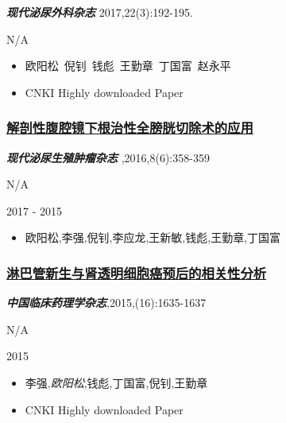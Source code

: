 \documentclass[]{article}
\providecommand{\tightlist}{%
  \setlength{\itemsep}{0pt}\setlength{\parskip}{0pt}}
\begin{document}
\emph{\textbf{现代泌尿外科杂志}} 2017,22(3):192-195.

N/A

\begin{itemize}
\tightlist
\item
  欧阳松~倪钊~钱彪~王勤章~丁国富~赵永平
\item
   CNKI Highly downloaded Paper
\end{itemize}

\hypertarget{ux89e3ux5256ux6027ux8179ux8154ux955cux4e0bux6839ux6cbbux6027ux5168ux8180ux80f1ux5207ux9664ux672fux7684ux5e94ux7528}{%
\subsubsection{\texorpdfstring{\href{https://doi.org/10.3870/j.issn.1674-4624.2016.06.010}{解剖性腹腔镜下根治性全膀胱切除术的应用}}{解剖性腹腔镜下根治性全膀胱切除术的应用}}\label{ux89e3ux5256ux6027ux8179ux8154ux955cux4e0bux6839ux6cbbux6027ux5168ux8180ux80f1ux5207ux9664ux672fux7684ux5e94ux7528}}

\emph{\textbf{现代泌尿生殖肿瘤杂志}} ,2016,8(6):358-359

N/A

2017 - 2015

\begin{itemize}
\tightlist
\item
  欧阳松,李强,倪钊,李应龙,王新敏,钱彪,王勤章,丁国富
\end{itemize}

\hypertarget{ux6dcbux5df4ux7ba1ux65b0ux751fux4e0eux80beux900fux660eux7ec6ux80deux764cux9884ux540eux7684ux76f8ux5173ux6027ux5206ux6790}{%
\subsubsection{\texorpdfstring{\href{http://kns.cnki.net/kcms/detail/detail.aspx?FileName=GLYZ201516025\&DbName=CJFQ2015}{淋巴管新生与肾透明细胞癌预后的相关性分析}}{淋巴管新生与肾透明细胞癌预后的相关性分析}}\label{ux6dcbux5df4ux7ba1ux65b0ux751fux4e0eux80beux900fux660eux7ec6ux80deux764cux9884ux540eux7684ux76f8ux5173ux6027ux5206ux6790}}

\emph{\textbf{中国临床药理学杂志}},2015,(16):1635-1637

N/A

2015

\begin{itemize}
\tightlist
\item
  李强,\emph{欧阳松},钱彪,丁国富,倪钊,王勤章
\item
   CNKI Highly downloaded Paper
\end{itemize}
\end{document}
